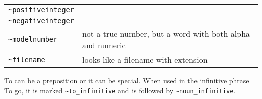 \documentclass[]{article}
\begin{document}
\begin{longtable}[]{@{}ll@{}}
\begin{minipage}[t]{0.30\columnwidth}
\texttt{\textasciitilde{}positiveinteger}\strut
\end{minipage} & \begin{minipage}[t]{0.20\columnwidth}\raggedright\strut
\strut
\end{minipage}\tabularnewline
\begin{minipage}[t]{0.30\columnwidth}\raggedright\strut
\texttt{\textasciitilde{}negativeinteger}\strut
\end{minipage} & \begin{minipage}[t]{0.20\columnwidth}\raggedright\strut
\strut
\end{minipage}\tabularnewline
\begin{minipage}[t]{0.30\columnwidth}\raggedright\strut
\texttt{\textasciitilde{}modelnumber}\strut
\end{minipage} & \begin{minipage}[t]{0.20\columnwidth}\raggedright\strut
not a true number, but a word with both alpha and numeric\strut
\end{minipage}\tabularnewline
\begin{minipage}[t]{0.30\columnwidth}\raggedright\strut
\texttt{\textasciitilde{}filename}\strut
\end{minipage} & \begin{minipage}[t]{0.20\columnwidth}\raggedright\strut
looks like a filename with extension\strut
\end{minipage}\tabularnewline
\bottomrule
\end{longtable}

To can be a preposition or it can be special. When used in the
infinitive phrase To go, it is marked
\texttt{\textasciitilde{}to\_infinitive} and is followed by
\texttt{\textasciitilde{}noun\_infinitive}.
\end{document}
